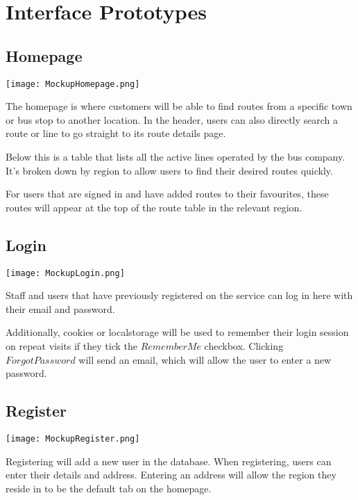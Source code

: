 \section{Interface Prototypes}

\subsection{Homepage}

\texttt{[image: MockupHomepage.png]}

\medskip

The homepage is where customers will be able to find routes from a
specific town or bus stop to another location. In the header, users
can also directly search a route or line to go straight to its route
details page.

\medskip

Below this is a table that lists all the active lines operated by
the bus company. It's broken down by region to allow users to find
their desired routes quickly.

\medskip

For users that are signed in and have added routes to their
favourites, these routes will appear at the top of the route table
in the relevant region.

\subsection{Login}

\texttt{[image: MockupLogin.png]}

\medskip

Staff and users that have previously registered on the service can log in here
with their email and password.

\medskip

Additionally, cookies or localstorage
will be used to remember their login session on repeat visits if
they tick the $Remember Me$ checkbox. Clicking $Forgot Password$
will send an email, which will allow the user to enter a new
password.

\subsection{Register}

\texttt{[image: MockupRegister.png]}

\medskip

Registering will add a new user in the database. When registering,
users can enter their details and address. Entering an address will
allow the region they reside in to be the default tab on the
homepage.

